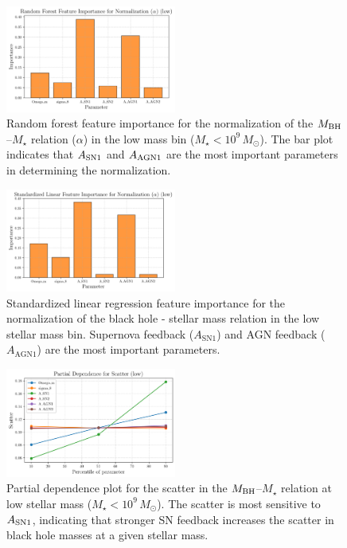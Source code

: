 \documentclass[twocolumn]{aastex631}
\begin{document}
\begin{figure}[ht!]
    \centering
    \includegraphics[width=0.5\textwidth]{../Project5/plots/featimp_RandomForest_Normalization_alpha_low_30_20250423_182538.png}
    \caption{Random forest feature importance for the normalization of the $M_{\rm BH}$–$M_{\star}$ relation ($\alpha$) in the low mass bin ($M_{\star}<10^9\,M_\odot$). The bar plot indicates that $A_{\rm SN1}$ and $A_{\rm AGN1}$ are the most important parameters in determining the normalization.
}
    \label{fig:featimp_norm_low}
\end{figure}

\begin{figure}[ht!]
    \centering
    \includegraphics[width=0.5\textwidth]{../Project5/plots/featimp_StandardizedLinear_Normalization_alpha_low_31_20250423_182539.png}
    \caption{Standardized linear regression feature importance for the normalization of the black hole - stellar mass relation in the low stellar mass bin. Supernova feedback ($A_\mathrm{SN1}$) and AGN feedback ($A_\mathrm{AGN1}$) are the most important parameters.
}
    \label{fig:featimp_norm_linear_low}
\end{figure}

\begin{figure}[ht!]
    \centering
    \includegraphics[width=0.5\textwidth]{../Project5/plots/pdp_Scatter_low_35_20250423_182541.png}
    \caption{Partial dependence plot for the scatter in the $M_{\rm BH}$–$M_{\star}$ relation at low stellar mass ($M_{\star}<10^9\,M_\odot$). The scatter is most sensitive to $A_{\rm SN1}$, indicating that stronger SN feedback increases the scatter in black hole masses at a given stellar mass.
}
    \label{fig:pdp_scatter_low}
\end{figure}
\end{document}
